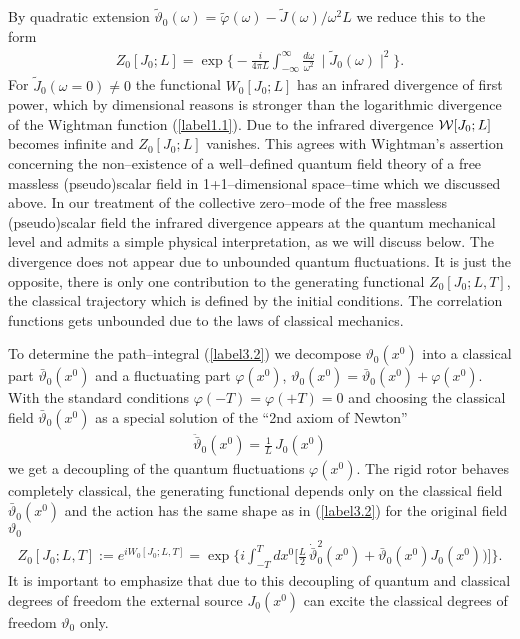 \documentclass[a4paper,12pt] {article}
\begin{document}
%
By quadratic extension $\tilde{\vartheta}_0(\omega) =
\tilde{\varphi}(\omega) - \tilde{J}(\omega)/\omega^2L$ we reduce this
to the form 
%
\begin{eqnarray}\label{label3.6}
Z_0[J_0;L] = \exp\Big\{-\frac{i}{4\pi
L}\int^{\infty}_{-\infty}\frac{d\omega}{\omega^2}\,
\mid\tilde{J}_0(\omega)\mid^2\Big\}.
\end{eqnarray}
%
For $\tilde{J}_0(\omega = 0) \neq 0$ the functional $W_0[J_0;L]$
has an infrared divergence of first power, which by dimensional
reasons is stronger than the logarithmic divergence of the Wightman
function (\ref{label1.1}). Due to the infrared divergence ${\cal
  W}[J_0;L]$ becomes infinite and $Z_0[J_0;L]$ vanishes. This
agrees with Wightman's assertion concerning the non--existence of a
well--defined quantum field theory of a free massless (pseudo)scalar
field in 1+1--dimensional space--time which we discussed above.  In
our treatment of the collective zero--mode of the free massless
(pseudo)scalar field the infrared divergence appears at the quantum
mechanical level and admits a simple physical interpretation, as we
will discuss below. The divergence does not appear due to unbounded
quantum fluctuations. It is just the opposite, there is only one
contribution to the generating functional $Z_0[J_0;L,T]$, the
classical trajectory which is defined by the initial conditions. The
correlation functions gets unbounded due to the laws of classical
mechanics.

To determine the path--integral (\ref{label3.2}) we decompose
$\vartheta_0(x^0)$ into a classical part $\bar{\vartheta}_0(x^0)$ and
a fluctuating part $\varphi(x^0)$, $\vartheta_0(x^0) =
\bar{\vartheta}_0(x^0) + \varphi(x^0)$. With the standard conditions
$\varphi(-T) = \varphi(+T) = 0$ and choosing the classical field
$\bar{\vartheta}_0(x^0)$ as a special solution of the ``2nd axiom of Newton''
%
\begin{eqnarray}\label{label3.7}
\ddot{\bar{\vartheta}}_0(x^0) = \frac{1}{L}\,J_0(x^0)
\end{eqnarray}
%
we get a decoupling of the quantum fluctuations $\varphi(x^0)$.  The
rigid rotor behaves completely classical, the generating functional
depends only on the classical field $\bar{\vartheta}_0(x^0)$ and the
action has the same shape as in (\ref{label3.2}) for the original
field $\vartheta_0$
%
\begin{eqnarray}\label{label3.8}
Z_0[J_0;L,T] := e^{\textstyle iW_0[J_0;L,T]}
=\exp\Big\{i\int_{-T}^Tdx^0\Big[\frac{L}{2}\,
\dot{\bar{\vartheta}}^2_0(x^0) +
\bar{\vartheta}_0(x^0)J_0(x^0))\Big]\Big\}.
\end{eqnarray}
%
It is important to emphasize that due to this decoupling of quantum
and classical degrees of freedom the external source $J_0(x^0)$ can
excite the classical degrees of freedom $\vartheta_0$ only.
\end{document}
